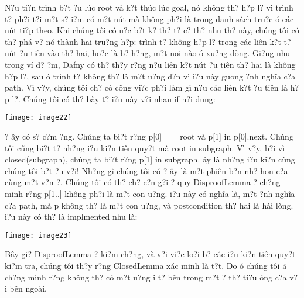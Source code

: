 \documentclass{article} %
\begin{document}
N?u ti?n tr\`{i}nh b?t {\dj}?u l\'{u}c root v\`{a} k?t th\'{u}c l\'{u}c goal, n\'{o} kh\^{o}ng th? h?p l? v\`{i} tr\`{i}nh t? ph?i t?i m?t s? {\dj}i?m c\'{o} m?t n\'{u}t m\`{a} kh\^{o}ng ph?i l\`{a} trong danh s\'{a}ch tru?c {\dj}\'{o} c\'{a}c n\'{u}t ti?p theo. Khi ch\'{u}ng t\^{o}i c\'{o} {\dj}u?c b?t k? th? t? c? th? nhu th? n\`{a}y, ch\'{u}ng t\^{o}i c\'{o} th? ph\'{a} v? n\'{o} th\`{a}nh hai tru?ng h?p: tr\`{i}nh t? kh\^{o}ng h?p l? trong c\'{a}c li\^{e}n k?t t? n\'{u}t {\dj}?u ti\^{e}n v\`{a}o th? hai, ho?c l\`{a} b? h?ng, m?t noi n\`{a}o {\dj}\'{o} xu?ng d\`{o}ng. Gi?ng nhu trong v\'{i} d? {\dj}?m, Dafny c\'{o} th? th?y r?ng n?u li\^{e}n k?t n\'{u}t {\dj}?u ti\^{e}n th? hai l\`{a} kh\^{o}ng h?p l?, sau {\dj}\'{o} tr\`{i}nh t? kh\^{o}ng th? l\`{a} m?t {\dj}u?ng d?n v\`{i} {\dj}i?u n\`{a}y guong {\dj}?nh ngh\~{i}a c?a path. V\`{i} v?y, ch\'{u}ng t\^{o}i ch? c\'{o} c\^{o}ng vi?c ph?i l\`{a}m g\`{i} n?u c\'{a}c li\^{e}n k?t {\dj}?u ti\^{e}n l\`{a} h?p l?. Ch\'{u}ng t\^{o}i c\'{o} th? b\`{a}y t? {\dj}i?u n\`{a}y v?i nhau if n?i dung:

\noindent \texttt{[image: image22]}

? {\dj}\^{a}y c\'{o} s? c?m ?ng. Ch\'{u}ng ta bi?t r?ng p[0] == root v\`{a} p[1] in p[0].next. Ch\'{u}ng t\^{o}i c\~{u}ng bi?t t? nh?ng {\dj}i?u ki?n ti\^{e}n quy?t m\`{a} root in subgraph. V\`{i} v?y, b?i v\`{i} closed(subgraph), ch\'{u}ng ta bi?t r?ng p[1] in subgraph. {\DJ}\^{a}y l\`{a} nh?ng {\dj}i?u ki?n c\`{u}ng ch\'{u}ng t\^{o}i b?t {\dj}?u v?i! Nh?ng g\`{i} ch\'{u}ng t\^{o}i c\'{o} ? {\dj}\^{a}y l\`{a} m?t phi\^{e}n b?n nh? hon c?a c\`{u}ng m?t v?n {\dj}?. Ch\'{u}ng t\^{o}i c\'{o} th? ch? c?n g?i {\dj}? quy DisproofLemma {\dj}? ch?ng minh r?ng p[1..] kh\^{o}ng ph?i l\`{a} m?t con {\dj}u?ng. {\DJ}i?u n\`{a}y c\'{o} ngh\~{i}a l\`{a}, m?t {\dj}?nh ngh\~{i}a c?a path, m\`{a} p kh\^{o}ng th? l\`{a} m?t con {\dj}u?ng, v\`{a} postcondition th? hai l\`{a} h\`{a}i l\`{o}ng. {\DJ}i?u n\`{a}y c\'{o} th? l\`{a} implmented nhu l\`{a}:

\noindent \texttt{[image: image23]}

B\^{a}y gi? DisproofLemma {\dj}? ki?m ch?ng, v\`{a} v?i vi?c lo?i b? c\'{a}c {\dj}i?u ki?n ti\^{e}n quy?t ki?m tra, ch\'{u}ng t\^{o}i th?y r?ng ClosedLemma x\'{a}c minh l\`{a} t?t. Do {\dj}\'{o} ch\'{u}ng t\^{o}i {\dj}\~{a} ch?ng minh r?ng kh\^{o}ng th? c\'{o} m?t {\dj}u?ng {\dj}i t? b\^{e}n trong m?t {\dj}? th? ti?u {\dj}\'{o}ng c?a v?i b\^{e}n ngo\`{a}i.
\end{document}
